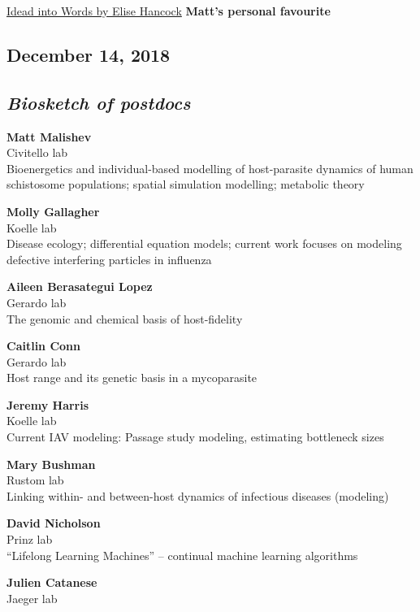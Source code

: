 \documentclass[10,portrait]{article}
\begin{document}
\href{https://www.amazon.com/Ideas-into-Words-Mastering-Science/dp/0801873304/ref=pd_sim_b_1}{Idead
into Words by Elise Hancock} \textbf{Matt's personal favourite}

\newpage    

\subsection{December 14, 2018}\label{december-14-2018}

\subsection{\texorpdfstring{\emph{Biosketch of
postdocs}}{Biosketch of postdocs}}\label{biosketch-of-postdocs}

\textbf{Matt Malishev}\\
Civitello lab\\
Bioenergetics and individual-based modelling of host-parasite dynamics
of human schistosome populations; spatial simulation modelling;
metabolic theory

\textbf{Molly Gallagher}\\
Koelle lab\\
Disease ecology; differential equation models; current work focuses on
modeling defective interfering particles in influenza

\textbf{Aileen Berasategui Lopez}\\
Gerardo lab\\
The genomic and chemical basis of host-fidelity

\textbf{Caitlin Conn}\\
Gerardo lab\\
Host range and its genetic basis in a mycoparasite

\textbf{Jeremy Harris}\\
Koelle lab\\
Current IAV modeling: Passage study modeling, estimating bottleneck
sizes

\textbf{Mary Bushman}\\
Rustom lab\\
Linking within- and between-host dynamics of infectious diseases
(modeling)

\textbf{David Nicholson}\\
Prinz lab\\
``Lifelong Learning Machines'' -- continual machine learning algorithms

\textbf{Julien Catanese}\\
Jaeger lab
\end{document}

